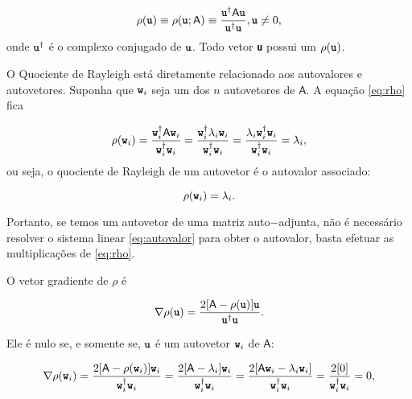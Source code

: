 \begin{equation}\label{eq:rho}
	\rho (\textbf{\texttt{u}}) \equiv \rho(\textbf{\texttt{u}}; \mathsf{A}) \equiv \frac{\textbf{\texttt{u}}^\dag \mathsf{A}\textbf{\texttt{u}}}{\textbf{\texttt{u}}^\dag \textbf{\texttt{u}}},   \textbf{\texttt{u}} \neq 0,
\end{equation}
onde $\textbf{\texttt{u}}^\dag$ é o complexo conjugado de $\textbf{\texttt{u}}$. Todo vetor \textbf{\texttt{u}} possui um $\rho(\textbf{\texttt{u}})$.

	O Quociente de Rayleigh está diretamente relacionado aos autovalores e autovetores. Suponha que $\textbf{\texttt{w}}_i$ seja um dos $n$ autovetores de $\mathsf{A}$. A equação \ref{eq:rho} fica
	
	\begin{equation}\label{eq:rho_no_w}
		\rho(\textbf{\texttt{w}}_i) = \frac{\textbf{\texttt{w}}_i^\dag \mathsf{A} \textbf{\texttt{w}}_i}{ \textbf{\texttt{w}}_i^\dag \textbf{\texttt{w}}_i} = \frac{\textbf{\texttt{w}}_i^\dag  \lambda_i \textbf{\texttt{w}}_i}{\textbf{\texttt{w}}_i^\dag \textbf{\texttt{w}}_i} = \frac{ \lambda_i \textbf{\texttt{w}}_i^\dag  \textbf{\texttt{w}}_i}{\textbf{\texttt{w}}_i^\dag \textbf{\texttt{w}}_i} = \lambda_i,
	\end{equation}
	ou seja, o quociente de Rayleigh de um autovetor é o autovalor associado:
	
	\begin{equation}\label{eq:rho_no_w_eh_lambda}
		\rho (\textbf{\texttt{w}}_i) = \lambda_i.
	\end{equation}
	
	Portanto, se temos um autovetor de uma matriz auto$-$adjunta, não é necessário resolver o sistema linear \ref{eq:autovalor} para obter o autovalor, basta efetuar as multiplicações de \ref{eq:rho}.
	
	O vetor gradiente de $\rho$ é \cite{Wilkinson1965}
	
	\begin{equation}\label{eq:gradrho}
		\nabla \rho (\textbf{\texttt{u}}) = \frac{2[\mathsf{A} - \rho(\textbf{\texttt{u}})] \textbf{\texttt{u}}}{\textbf{\texttt{u}}^\dag \textbf{\texttt{u}}}.
	\end{equation}

	Ele é nulo se, e somente se, $\textbf{\texttt{u}}$ é um autovetor $\textbf{\texttt{w}}_i$  de $\mathsf{A}$:
	
	\begin{equation}\label{eq:grad_rho_no_w}
		\nabla \rho (\textbf{\texttt{w}}_i) = \frac{2[\mathsf{A} - \rho(\textbf{\texttt{w}}_i)] \textbf{\texttt{w}}_i}{\textbf{\texttt{w}}_i^\dag \textbf{\texttt{w}}_i} = \frac{2[\mathsf{A} - \lambda_i]\textbf{\texttt{w}}_i}{\textbf{\texttt{w}}_i^\dag \textbf{\texttt{w}}_i} = \frac{2[\mathsf{A}\textbf{\texttt{w}}_i - \lambda_i\textbf{\texttt{w}}_i]}{\textbf{\texttt{w}}_i^\dag \textbf{\texttt{w}}_i} = \frac{2[0]}{\textbf{\texttt{w}}_i^\dag \textbf{\texttt{w}}_i} = 0,
	\end{equation}
	
